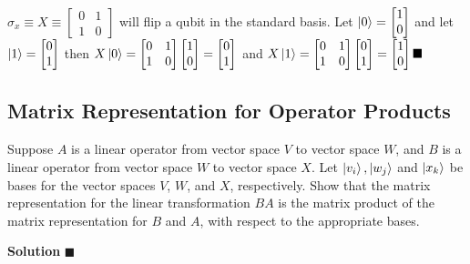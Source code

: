 \documentclass{article}
\begin{document}
$\sigma_{x} \equiv X \equiv \begin{bmatrix} 0 & 1 \\ 1 & 0\end{bmatrix}$ will
flip a qubit in the standard basis. Let $\ket{0} =
\begin{bmatrix}1 \\ 0\end{bmatrix}$ and let $\ket{1} = 
\begin{bmatrix}0 \\ 1\end{bmatrix}$ then $X\ket{0} =
\begin{bmatrix}0 & 1 \\ 1 & 0\end{bmatrix}\begin{bmatrix} 1 \\ 0\end{bmatrix} = 
\begin{bmatrix}0 \\ 1\end{bmatrix}$ and $X\ket{1} =
\begin{bmatrix}0 & 1 \\ 1 & 0\end{bmatrix}\begin{bmatrix} 0 \\ 1\end{bmatrix} =
\begin{bmatrix}1 \\ 0\end{bmatrix}\blacksquare$

\subsection{Matrix Representation for Operator Products}
Suppose $A$ is a linear operator from vector space $V$ to vector space $W$,
and $B$ is a linear operator from vector space $W$ to vector space $X$.
Let $\ket{v_{i}}, \ket{w_{j}}$ and $\ket{x_{k}}$ be bases for the vector
spaces $V$, $W$, and $X$, respectively. Show that the matrix
representation for the linear transformation $BA$ is the matrix product
of the matrix representation for $B$ and $A$, with respect to the appropriate
bases.

\textbf{Solution}
$\blacksquare$
\end{document}
